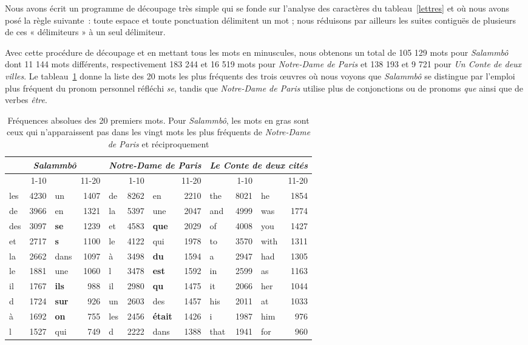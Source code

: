 \documentclass[]{article}
\begin{document}
Nous avons écrit un programme de découpage très simple qui se fonde sur l'analyse des caractères du tableau~\ref{lettres} et où nous avons posé la règle suivante~: toute espace et toute ponctuation délimitent un mot ; nous réduisons par ailleurs les suites contiguës de plusieurs de ces « délimiteurs » à un seul délimiteur.

Avec cette procédure de découpage et en mettant tous les mots en minuscules, nous obtenons un total de 105 129 mots pour \textit{Salammbô} dont 11 144 mots différents, respectivement 183 244 et 16 519 mots pour \textit{Notre-Dame de Paris} et 138 193 et 9 721 pour \textit{Un Conte de deux villes}.
Le tableau~\ref{mots} donne la liste des 20 mots les plus fréquents des trois œuvres où nous voyons que \textit{Salammbô} se distingue par l'emploi plus fréquent du pronom personnel réfléchi \textit{se}, tandis que \textit{Notre-Dame de Paris} utilise plus de conjonctions ou de pronoms \textit{que} ainsi que de verbes \textit{être}.

\begin{table}[htdp]
\caption{Fréquences absolues des 20 premiers mots. Pour \textit{Salammbô}, les mots en gras sont ceux qui n'apparaissent pas dans les vingt mots les plus fréquents de \textit{Notre-Dame de Paris} et réciproquement}
\begin{center}\begin{tabular}{lrlr|lrlr|lrlr}
\multicolumn{4}{c}{\textit{Salammbô}}&\multicolumn{4}{c}{\textit{Notre-Dame de Paris}}&\multicolumn{4}{c}{\textit{Le Conte de deux cités}}\\
\hline
&1-10&&11-20&&1-10&&11-20&&1-10&&11-20\\
\hline
\hline
les &4230&un& 1407&de& 8262&en&2210&the&8021&he& 1854\\
de & 3966& en&1321&la& 5397&une&2047&and&4999&was& 1774\\
des & 3097&\textbf{se}& 1239&et &4583&\textbf{que}&2029&of& 4008&you& 1427\\
et & 2717&\textbf{s}& 1100&le& 4122&qui&1978&to& 3570&with& 1311\\
la & 2662&dans& 1097&à& 3498&\textbf{du}&1594&a&2947&had& 1305\\
le &1881&une& 1060&l& 3478&\textbf{est}& 1592&in& 2599&as& 1163\\
il & 1767&\textbf{ils}& 988&il& 2980&\textbf{qu}& 1475&it& 2066&her& 1044\\
d& 1724&\textbf{sur}& 926&un& 2603&des& 1457&his& 2011&at& 1033\\
à &1692&\textbf{on}& 755&les& 2456&\textbf{était}& 1426&i& 1987&him& 976\\
l& 1527&qui& 749&d& 2222&dans&1388&that& 1941&for&960\\
\hline
\end{tabular} 
\end{center}
\label{mots}
\end{table}  
  
\end{document}
